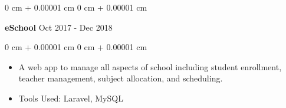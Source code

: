 \documentclass[10pt, letterpaper]{article}
\newenvironment{highlights}{
    \begin{itemize}[
        topsep=0.10 cm,
        parsep=0.10 cm,
        partopsep=0pt,
        itemsep=0pt,
        leftmargin=0 cm + 10pt
    ]
}{
    \end{itemize}
} %
\newenvironment{onecolentry}{
    \begin{adjustwidth}{
        0 cm + 0.00001 cm
    }{
        0 cm + 0.00001 cm
    }
}{
    \end{adjustwidth}
} %
\newenvironment{twocolentry}[2][]{
    \onecolentry
    \def\secondColumn{#2}
    \setcolumnwidth{\fill, 4.5 cm}
    \begin{paracol}{2}
}{
    \switchcolumn \raggedleft \secondColumn
    \end{paracol}
    \endonecolentry
} %
\begin{document}
        \vspace{0.2 cm}

        \begin{twocolentry}{
            Oct 2017 - Dec 2018
        }
            \textbf{eSchool}\end{twocolentry}

        \vspace{0.10 cm}
        \begin{onecolentry}
            \begin{highlights}
                \item A web app to manage all aspects of school including student enrollment, teacher management, subject allocation, and scheduling.
                \item Tools Used: Laravel, MySQL
            \end{highlights}
        \end{onecolentry}
\end{document}
